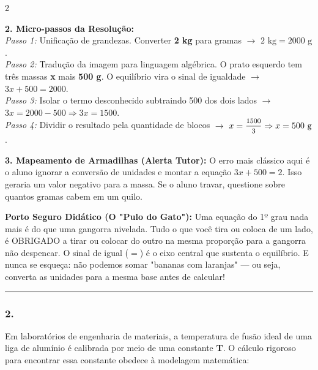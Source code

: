 \begin{multicols*}{2}
\begin{tcolorbox}[colback=CorTitUm!5, colframe=CorTitUm, boxrule=1pt, arc=4pt, left=6pt, right=6pt, top=6pt, bottom=6pt]
    \textbf{2. Micro-passos da Resolução:}\\
    \textit{Passo 1:} Unificação de grandezas. Converter \textbf{2 kg} para gramas $\rightarrow$ $2 \text{ kg} = 2000 \text{ g}$.\\
    \textit{Passo 2:} Tradução da imagem para linguagem algébrica. O prato esquerdo tem três massas \textbf{x} mais \textbf{500 g}. O equilíbrio vira o sinal de igualdade $\rightarrow$ $3x + 500 = 2000$.\\
    \textit{Passo 3:} Isolar o termo desconhecido subtraindo 500 dos dois lados $\rightarrow$ $3x = 2000 - 500 \Rightarrow 3x = 1500$.\\
    \textit{Passo 4:} Dividir o resultado pela quantidade de blocos $\rightarrow$ $x = \mfrac{1500}{3} \Rightarrow x = 500 \text{ g}$.\par\vspace{0.1cm}
    
    \textbf{3. Mapeamento de Armadilhas (Alerta Tutor):} O erro mais clássico aqui é o aluno ignorar a conversão de unidades e montar a equação $3x + 500 = 2$. Isso geraria um valor negativo para a massa. Se o aluno travar, questione sobre quantos gramas cabem em um quilo.
    \end{tcolorbox}
    \vspace{0.15cm}
    
    \begin{boxexplicacao}
    \textbf{Porto Seguro Didático (O "Pulo do Gato"):} Uma equação do 1º grau nada mais é do que uma gangorra nivelada. Tudo o que você tira ou coloca de um lado, é OBRIGADO a tirar ou colocar do outro na mesma proporção para a gangorra não despencar. O sinal de igual ($=$) é o eixo central que sustenta o equilíbrio. E nunca se esqueça: não podemos somar "bananas com laranjas" — ou seja, converta as unidades para a mesma base antes de calcular!
    \end{boxexplicacao}
\fi
    
\par\vspace{\espacoQuestao}


\noindent\textcolor{CorLinha}{\rule{\linewidth}{0.5pt}} 
\par\vspace{\espacoPreQuestao}
\subsubsection*{2.} 
\begin{enunciadoLiteral}
Em laboratórios de engenharia de materiais, a temperatura de fusão ideal de uma liga de alumínio é calibrada por meio de uma constante \textbf{T}. O cálculo rigoroso para encontrar essa constante obedece à modelagem matemática:


\end{enunciadoLiteral}
\end{multicols*}

